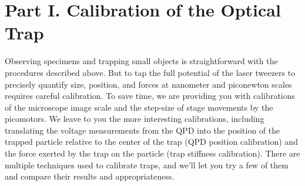 \documentclass{../lab}
\begin{document}

    




\section{Part I. Calibration of the Optical Trap}

Observing specimens and trapping small objects is straightforward with the procedures described above. But to tap the full potential of the laser tweezers to precisely quantify size, position, and forces at nanometer and piconewton scales requires careful calibration. To save time, we are providing you with calibrations of the microscope image scale and the step-size of stage movements by the picomotors. We leave to you the more interesting calibrations, including translating the voltage measurements from the QPD into the position of the trapped particle relative to the center of the trap (QPD position calibration) and the force exerted by the trap on the particle (trap stiffness calibration). There are multiple techniques used to calibrate traps, and we'll let you try a few of them and compare their results and appropriateness.
\end{document}
